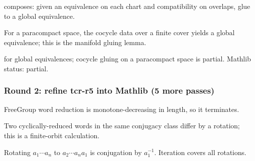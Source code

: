 \begin{lemma}
\label{lem:rgb-r8}
 composes: given an equivalence on each chart and compatibility on overlaps, glue to a global equivalence.
\leanok\mathlibok
\end{lemma}

\begin{lemma}
\label{lem:rgb-r9}
For a paracompact space, the cocycle data over a finite cover yields a global equivalence; this is the manifold gluing lemma.
\leanok
\end{lemma}

\begin{lemma}
\label{lem:rgb-r10}
 for global equivalences; cocycle gluing on a paracompact space is partial.  Mathlib status: partial.
\leanok
\end{lemma}

\subsubsection*{Round 2: refine tcr-r5 into Mathlib (5 more passes)}

\begin{lemma}
\label{lem:tcr-r6}
FreeGroup word reduction is monotone-decreasing in length, so it terminates.
\leanok
\end{lemma}

\begin{lemma}
\label{lem:tcr-r7}
Two cyclically-reduced words in the same conjugacy class differ by a rotation; this is a finite-orbit calculation.
\leanok
\end{lemma}

\begin{lemma}
\label{lem:tcr-r8}
Rotating $a_{1}\cdots a_{n}$ to $a_{2}\cdots a_{n} a_{1}$ is conjugation by $a_{1}^{-1}$.  Iteration covers all rotations.
\leanok
\end{lemma}

